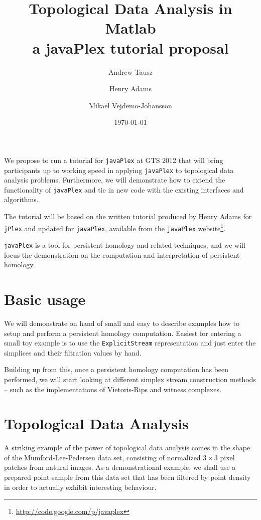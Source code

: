 \documentclass{amsart}
\newcommand\jPlex{\texttt{jPlex}\xspace}
\newcommand\javaPlex{\texttt{javaPlex}\xspace}
\begin{document}
\title{Topological Data Analysis in Matlab \\ a javaPlex tutorial proposal}
\author{Andrew Tausz}
\address{Stanford University}
\author{Henry Adams}
\address{Stanford University}
\author{Mikael Vejdemo-Johansson}
\address{University of St Andrews}
\date{\today}
\maketitle


We propose to run a tutorial for \javaPlex at GTS 2012 that will bring participants up to working speed in applying \javaPlex to topological data analysis problems. Furthermore, we will demonstrate how to extend the functionality of \javaPlex and tie in new code with the existing interfaces and algorithms.

The tutorial will be based on the written tutorial produced by Henry Adams for \jPlex and updated for \javaPlex, available from the \javaPlex website\footnote{\url{http://code.google.com/p/javaplex}}.

\javaPlex is a tool for persistent homology and related techniques, and we will focus the demonstration on the computation and interpretation of persistent homology.

\section{Basic usage}
\label{sec:basic-usage}

We will demonstrate on hand of small and easy to describe examples how to setup and perform a persistent homology computation. Easiest for entering a small toy example is to use the \texttt{ExplicitStream} representation and just enter the simplices and their filtration values by hand. 

Building up from this, once a persistent homology computation has been performed, we will start looking at different simplex stream construction methods -- such as the implementations of Vietoris-Rips and witness complexes. 

\section{Topological Data Analysis}
\label{sec:topol-data-analys}

A striking example of the power of topological data analysis comes in the shape of the Mumford-Lee-Pedersen data set, consisting of normalized $3\times 3$ pixel patches from natural images. As a demonstrational example, we shall use a prepared point sample from this data set that has been filtered by point density in order to actually exhibit interesting behaviour.
\end{document}
